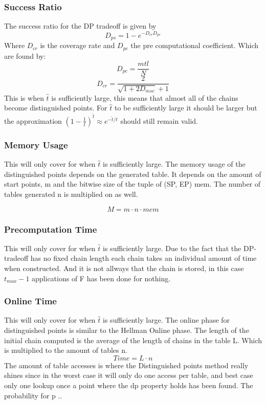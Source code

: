 \subsubsection{Success Ratio}
The success ratio for the DP tradeoff is given by
\begin{equation}
  D_{ps}=1-e^{-D_{cr}D_{pc}}
\end{equation}
Where $D_{cr}$ is the coverage rate and $D_{pc}$ the pre computational coefficient. Which are found by:
\begin{equation}
  D_{pc}=\frac{mtl}{N}
\end{equation}
\begin{equation}
  D_{cr}=\frac{2}{\sqrt{1+2D_{msc}}+1}
\end{equation}
This is when $\hat{t}$ is sufficiently large, this means that almost all of the chains become distinguished points. For $\hat{t}$ to be sufficiently large it should be larger but the approximation $(1-\frac{1}{t})^{\hat{t}}\approx e^{-\hat{t}/t}$ should still remain valid.
\subsubsection{Memory Usage}
This will only cover for when $\hat{t}$ is sufficiently large.
The memory usage of the distinguished points depends on the generated table. It depends on the amount of start points, m and the bitwise size of the tuple of (SP, EP) mem. The number of tables generated n is multiplied on as well.

\begin{equation}
  M=m\cdot n\cdot mem
\end{equation}

\subsubsection{Precomputation Time}
This will only cover for when $\hat{t}$ is sufficiently large.
Due to the fact that the DP-tradeoff has no fixed chain length each chain takes an individual amount of time when constructed. And it is not allways that the chain is stored, in this case $t_{max}-1$ applications of F has been done for nothing.

\subsubsection{Online Time}
This will only cover for when $\hat{t}$ is sufficiently large.
The online phase for distinguished points is similar to the Hellman Online phase. The length of the initial chain computed is the average of the length of chains in the table L. Which is multiplied to the amount of tables n.
\begin{equation}
  Time=L\cdot n
\end{equation}
The amount of table accesses is where the Distinguished points method really shines since in the worst case it will only do one access per table, and best case only one lookup once a point where the dp property holds has been found.
The probability for p ..




